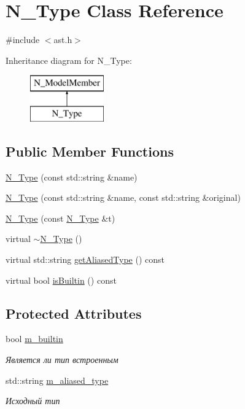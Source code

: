 \hypertarget{classN__Type}{}\section{N\+\_\+\+Type Class Reference}
\label{classN__Type}


{\ttfamily \#include $<$ast.\+h$>$}

Inheritance diagram for N\+\_\+\+Type\+:\begin{figure}[H]
\begin{center}
\leavevmode
\includegraphics[height=2.000000cm]{classN__Type}
\end{center}
\end{figure}
\subsection*{Public Member Functions}
\begin{DoxyCompactItemize}
\item 
\hyperlink{classN__Type_acb49f4ac3823f81476aecdc786912927}{N\+\_\+\+Type} (const std\+::string \&name)
\item 
\hyperlink{classN__Type_aaadb2c45fb50a87d4bc9e38690606ed5}{N\+\_\+\+Type} (const std\+::string \&name, const std\+::string \&original)
\item 
\hyperlink{classN__Type_a3e032190309b0fa6c2f952248693229c}{N\+\_\+\+Type} (const \hyperlink{classN__Type}{N\+\_\+\+Type} \&t)
\item 
virtual \hyperlink{classN__Type_a1e16bc2b69f6604bea8f0938717645e7}{$\sim$\+N\+\_\+\+Type} ()
\item 
virtual std\+::string \hyperlink{classN__Type_afc6dd4daafea765545a116847ebae9e7}{get\+Aliased\+Type} () const 
\item 
virtual bool \hyperlink{classN__Type_a5b3d5eb542b6fd1976d85308eaa88c8e}{is\+Builtin} () const 
\end{DoxyCompactItemize}
\subsection*{Protected Attributes}
\begin{DoxyCompactItemize}
\item 
bool \hyperlink{classN__Type_af024de34517a3d91855aa863b8954f75}{m\+\_\+builtin}
\begin{DoxyCompactList}\small\item\em Является ли тип встроенным \end{DoxyCompactList}\item 
std\+::string \hyperlink{classN__Type_a3498f93c81b4c579e16b6ba70cb957b8}{m\+\_\+aliased\+\_\+type}
\begin{DoxyCompactList}\small\item\em Исходный тип \end{DoxyCompactList}\end{DoxyCompactItemize}


